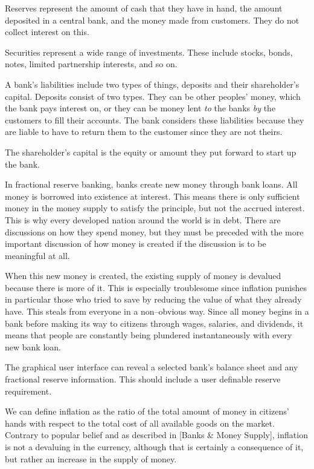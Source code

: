 Reserves represent the amount of cash that they have in hand, the amount deposited in a central bank, and the money made from customers. They do not collect interest on this. 

Securities represent a wide range of investments. These include stocks, bonds, notes, limited partnership interests, and so on.

A bank's liabilities include two types of things, deposits and their shareholder's capital. Deposits consist of two types. They can be other peoples' money, which the bank pays interest on, or they can be money lent {\it to} the banks {\it by} the customers to fill their accounts. The bank considers these liabilities because they are liable to have to return them to the customer since they are not theirs.

The shareholder's capital is the equity or amount they put forward to start up the bank.

In fractional reserve banking, banks create new money through bank loans. All money is borrowed into existence at interest. This means there is only sufficient money in the money supply to satisfy the principle, but not the accrued interest. This is why every developed nation around the world is in debt. There are discussions on how they spend money, but they must be preceded with the more important discussion of how money is created if the discussion is to be meaningful at all.

When this new money is created, the existing supply of money is devalued because there is more of it. This is especially troublesome since inflation punishes in particular those who tried to save by reducing the value of what they already have. This steals from everyone in a non--obvious way. Since all money begins in a bank before making its way to citizens through wages, salaries, and dividends, it means that people are constantly being plundered instantaneously with every new bank loan.

The graphical user interface can reveal a selected bank's balance sheet and any fractional reserve information. This should include a user definable reserve requirement.

We can define inflation as the ratio of the total amount of money in citizens' hands with respect to the total cost of all available goods on the market. Contrary to popular belief and as described in [Banks & Money Supply], inflation is not a devaluing in the currency, although that is certainly a consequence of it, but rather an increase in the supply of money. 

